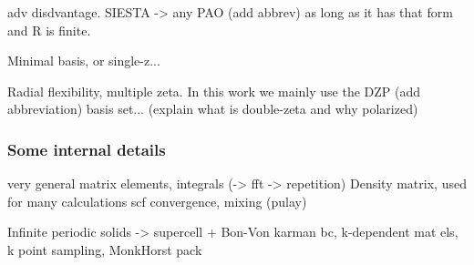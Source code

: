 adv disdvantage. SIESTA -> any PAO (add abbrev) as long as it has that form and R is finite.

Minimal basis, or single-z...

Radial flexibility, multiple zeta. In this work we mainly use the DZP (add abbreviation) basis set... (explain what is double-zeta and why polarized)

\subsubsection{Some internal details}
very general matrix elements, integrals (-> fft -> repetition)
Density matrix, used for many calculations
scf convergence, mixing (pulay)

Infinite periodic solids -> supercell + Bon-Von karman bc,
k-dependent mat els, k point sampling, MonkHorst pack



%
%
%
%
%


